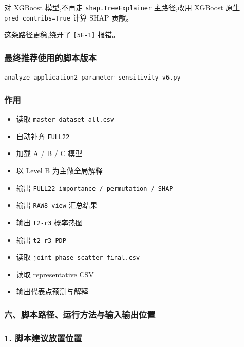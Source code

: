 \documentclass[lang=cn,scheme=chinese,color=blue,device=normal,toc=onecol,math=cm]{elegantbook}
\begin{document}
对 XGBoost 模型,不再走 \texttt{shap.TreeExplainer} 主路径,改用 XGBoost 原生 \texttt{pred\_\allowbreak{}contribs=True} 计算 SHAP 贡献。\par


这条路径更稳,绕开了 \texttt{[5E-1]} 报错。\par


\subsubsection{最终推荐使用的脚本版本}


\texttt{analyze\_\allowbreak{}application2\_\allowbreak{}parameter\_\allowbreak{}sensitivity\_\allowbreak{}v6.py}\par


\subsubsection{作用}


\begin{itemize}
\item 读取 \texttt{master\_\allowbreak{}dataset\_\allowbreak{}all.csv}
\item 自动补齐 \texttt{FULL22}
\item 加载 A /\allowbreak{} B /\allowbreak{} C 模型
\item 以 Level B 为主做全局解释
\item 输出 \texttt{FULL22 importance /\allowbreak{} permutation /\allowbreak{} SHAP}
\item 输出 \texttt{RAW8-view} 汇总结果
\item 输出 \texttt{t2-r3} 概率热图
\item 输出 \texttt{t2-r3 PDP}
\item 读取 \texttt{joint\_\allowbreak{}phase\_\allowbreak{}scatter\_\allowbreak{}final.csv}
\item 读取 representative CSV
\item 输出代表点预测与解释
\end{itemize}


\subsubsection{六、脚本路径、运行方法与输入输出位置}


\subsubsection{1. 脚本建议放置位置}
\end{document}
